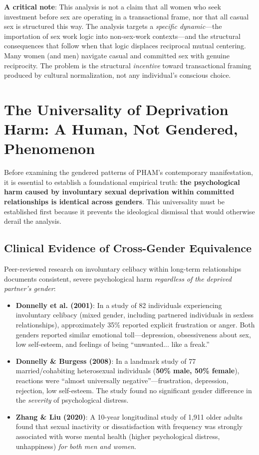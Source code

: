 \documentclass[12pt,openany]{book}
\numberwithin{equation}{chapter}
\begin{document}
\textbf{A critical note}: This analysis is not a claim that all women who seek investment before sex are operating in a transactional frame, nor that all casual sex is structured this way. The analysis targets a \textit{specific dynamic}---the importation of sex work logic into non-sex-work contexts---and the structural consequences that follow when that logic displaces reciprocal mutual centering. Many women (and men) navigate casual and committed sex with genuine reciprocity. The problem is the structural \textit{incentive} toward transactional framing produced by cultural normalization, not any individual's conscious choice.

\section{The Universality of Deprivation Harm: A Human, Not Gendered, Phenomenon}

Before examining the gendered patterns of PHAM's contemporary manifestation, it is essential to establish a foundational empirical truth: \textbf{the psychological harm caused by involuntary sexual deprivation within committed relationships is identical across genders}. This universality must be established first because it prevents the ideological dismissal that would otherwise derail the analysis.

\subsection{Clinical Evidence of Cross-Gender Equivalence}

Peer-reviewed research on involuntary celibacy within long-term relationships documents consistent, severe psychological harm \textit{regardless of the deprived partner's gender}:

\begin{itemize}
    \item \textbf{Donnelly et al. (2001)}: In a study of 82 individuals experiencing involuntary celibacy (mixed gender, including partnered individuals in sexless relationships), approximately 35\% reported explicit frustration or anger. Both genders reported similar emotional toll---depression, obsessiveness about sex, low self-esteem, and feelings of being ``unwanted... like a freak.''
    
    \item \textbf{Donnelly \& Burgess (2008)}: In a landmark study of 77 married/cohabiting heterosexual individuals (\textbf{50\% male, 50\% female}), reactions were ``almost universally negative''---frustration, depression, rejection, low self-esteem. The study found no significant gender difference in the \textit{severity} of psychological distress.
    
    \item \textbf{Zhang \& Liu (2020)}: A 10-year longitudinal study of 1,911 older adults found that sexual inactivity or dissatisfaction with frequency was strongly associated with worse mental health (higher psychological distress, unhappiness) \textit{for both men and women}.
\end{itemize}
\end{document}
